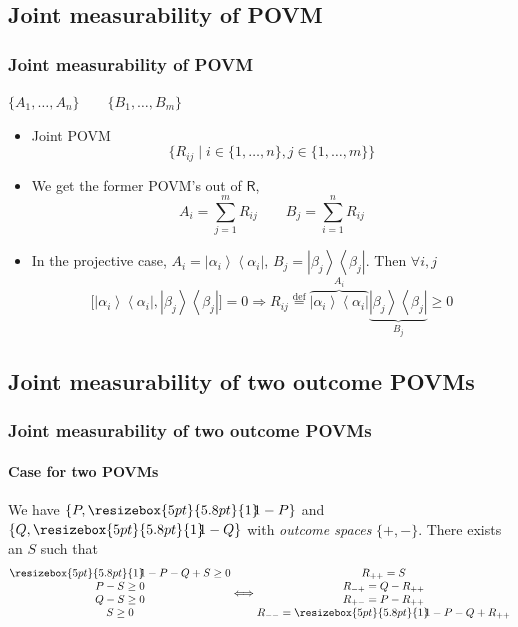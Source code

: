 \documentclass[mathserif,handout]{beamer}
\newcommand{\ket}[1]{\left| #1\right\rangle}
\newcommand{\bra}[1]{\left\langle #1\right|}
\newcommand{\projector}[1]{\ket{#1}\!\!\bra{#1}}
\newcommand{\bbone}{\ensuremath{\resizebox{5pt}{5.8pt}{1}\hspace{-3.5pt}1}}
\newcommand{\defeq}{\overset{\mathrm{def}}{=}}
\begin{document}
\begin{frame}
\section{Joint measurability of POVM}
\frametitle{Joint measurability of POVM}

\begin{center}
$\{A_{1}, \ldots , A_{n}\}\qquad \{B_{1}, \ldots , B_{m}\}$ 
\end{center}

\begin{itemize}[<+->]
\item Joint POVM
$$
\{ R_{ij} \mid i\in\{1, \ldots , n\}, j \in \{1, \ldots , m\}  \}
$$
\item We get the former POVM's out of $\mathsf{R}$, 
$$
A_{i} = \sum_{j= 1}^{m}R_{ij} \qquad B_{j}  = \sum_{i=1}^{n}R_{ij}
$$
\item In the projective case, $A_{i} = \projector{\alpha_{i}}$, $B_{j} = \projector{\beta_{j}}$. Then $\forall i ,j$
$$
\big [\projector{\alpha_{i}} ,\projector{\beta_{j}}\big ] = 0
 \Rightarrow 
 R_{ij}
 \defeq 
 \overbrace{\projector{\alpha_{i}}}^{A_{i}}
 \underbrace{\projector{\beta_{j}}}_{B_{j}}
 \geq 0
$$ 
\end{itemize}


\end{frame}



\begin{frame}
\section{ Joint measurability of two outcome POVMs}
\frametitle{ Joint measurability of two outcome POVMs }
\framesubtitle{Case for two POVMs}
We have $\{P, \bbone - P\}$ and $\{Q, \bbone - Q\}$ with \emph{outcome spaces} $\{+,-\}$. There exists an $S$ such that 
$$
\begin{matrix}
\bbone - P - Q + S \geq 0 \\
P - S \geq 0 \\
Q -S \geq 0 \\
S\geq 0 
\end{matrix}
\Longleftrightarrow
\begin{matrix}
R_{++}= S \\
R_{-+}= Q - R_{++}\\
R_{+-}= P - R_{++}\\
R_{--} = \bbone - P - Q + R_{++}
\end{matrix}
$$


\end{frame}
\end{document}
